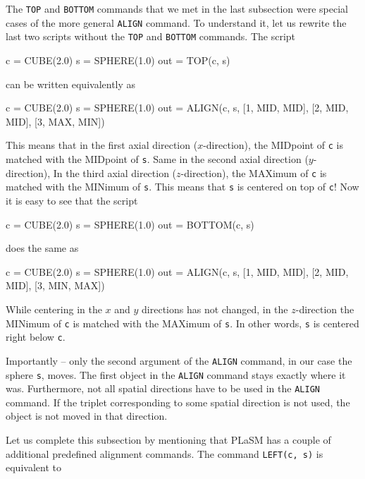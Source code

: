 The {\tt TOP} and {\tt BOTTOM} commands that we met in the last subsection 
were special cases of the more general {\tt ALIGN} command. To understand it, 
let us rewrite the last two scripts without the {\tt TOP} and {\tt BOTTOM}
commands. The script 

\begin{bluecode}
c = CUBE(2.0)
s = SPHERE(1.0)
out = TOP(c, s)
\end{bluecode}
can be written equivalently as

\begin{bluecode}
c = CUBE(2.0)
s = SPHERE(1.0)
out = ALIGN(c, s, [1, MID, MID], [2, MID, MID], [3, MAX, MIN])
\end{bluecode}
This means that in the first axial direction ($x$-direction), the MIDpoint of {\tt c} is matched 
with the MIDpoint of {\tt s}. Same in the second axial direction ($y$-direction), In the 
third axial direction ($z$-direction), the MAXimum of {\tt c} is matched with the MINimum of {\tt s}.
This means that {\tt s} is centered on top of {\tt c}! Now it is easy to see that the 
script 

\begin{bluecode}
c = CUBE(2.0)
s = SPHERE(1.0)
out = BOTTOM(c, s)
\end{bluecode}
does the same as 

\begin{bluecode}
c = CUBE(2.0)
s = SPHERE(1.0)
out = ALIGN(c, s, [1, MID, MID], [2, MID, MID], [3, MIN, MAX])
\end{bluecode}
While centering in the $x$ and $y$ directions has not changed, in the $z$-direction 
the MINimum of {\tt c} is matched with the MAXimum of {\tt s}. In other words,
{\tt s} is centered right below {\tt c}. 

Importantly -- only the second argument of the {\tt ALIGN} command, in our case the sphere {\tt s}, moves. The first 
object in the {\tt ALIGN} command stays exactly where it was. Furthermore, not all spatial directions 
have to be used in the {\tt ALIGN} command. If the triplet corresponding to some spatial direction 
is not used, the object is not moved in that direction. 

Let us complete this subsection by mentioning that PLaSM has a couple of additional
predefined alignment commands. The command {\tt LEFT(c, s)} is equivalent to

